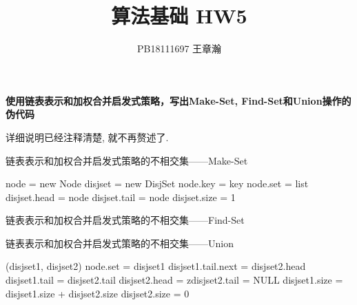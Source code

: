 \documentclass[UTF8]{article}
\title{算法基础 HW5}
\author{PB18111697 王章瀚}
\newcommand{\jumpLine} {\hspace*{\fill} \par}
\begin{document}
\maketitle
\section{}
\noindent \textbf{使用链表表示和加权合并启发式策略，写出{\sc Make-Set}, {\sc Find-Set}和{\sc Union}操作的伪代码}\\
\jumpLine
\noindent 详细说明已经注释清楚, 就不再赘述了.\\
\begin{minipage}{\linewidth*5/7}
	\begin{algorithm}[H]
		\caption{链表表示和加权合并启发式策略的不相交集——{\sc Make-Set}}
		\begin{algorithmic}[1] %
			\State node = new Node
			\State disjset = new DisjSet
			\State node.key = key
			\State node.set = list 
			\State disjset.head = node
			\State disjset.tail = node 
			\State disjset.size = 1
			\State {}
		\EndFunction
		\end{algorithmic}
	\end{algorithm}
		
	\begin{algorithm}[H]
		\caption{链表表示和加权合并启发式策略的不相交集——{\sc Find-Set}}
		\begin{algorithmic}[1] %
			\State {} 
		\EndFunction
		\end{algorithmic}
	\end{algorithm}
		
	\begin{algorithm}[H]
		\caption{链表表示和加权合并启发式策略的不相交集——{\sc Union}}
		\begin{algorithmic}[1] %
				(disjset1, disjset2) 
			\EndIf
			 
				\State node.set = disjset1
			\EndFor
			\State disjset1.tail.next = disjset2.head
			\State disjset1.tail = disjset2.tail 
			\State disjset2.head = zdisjset2.tail = NULL 
			\State disjset1.size = disjset1.size + disjset2.size 
			\State disjset2.size = 0 
		\EndFunction
		\end{algorithmic}
	\end{algorithm}
\end{minipage}
\end{document}
